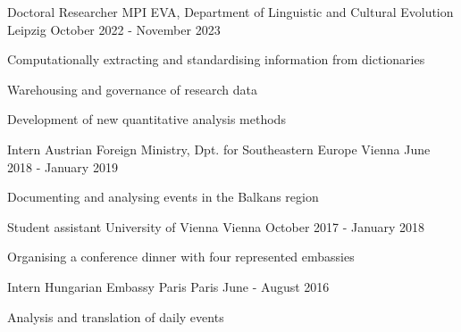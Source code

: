 \begin{cventries}

  \cventry
    {Doctoral Researcher} %
    {MPI EVA, Department of Linguistic and Cultural Evolution} %
    {Leipzig} %
    {October 2022 - November 2023} %
    {
      \begin{cvitems} %
      \item{Computationally extracting and standardising information from dictionaries}
      \item{Warehousing and governance of research data}
      \item{Development of new quantitative analysis methods}
      \end{cvitems}
    }
    
  \cventry
    {Intern} %
    {Austrian Foreign Ministry, Dpt. for Southeastern Europe} %
    {Vienna} %
    {June 2018 - January 2019} %
    {
      \begin{cvitems} %
        \item{Documenting and analysing events in the Balkans region}
      \end{cvitems}
    }

  \cventry
    {Student assistant} %
    {University of Vienna} %
    {Vienna} %
    {October 2017 - January 2018} %
    {
    \begin{cvitems}
    {Organising a conference dinner with four represented embassies}
    \end{cvitems}
    }
    
  \cventry
    {Intern} %
    {Hungarian Embassy Paris} %
    {Paris} %
    {June - August 2016} %
    {
    \begin{cvitems}
    {Analysis and translation of daily events}
    \end{cvitems}
    }
    
\end{cventries}

